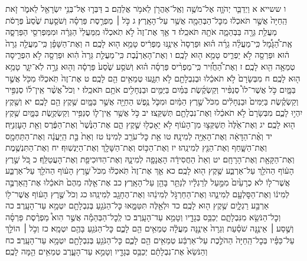 \documentclass[twoside, openany, parskip=half, 11pt]{book}
\begin{document}
ו ששייא א וַיְדַבֵּ֧ר יְהֹוָ֛ה אֶל־מֹשֶׁ֥ה וְאֶֽל־אַהֲרֹ֖ן לֵאמֹ֥ר אֲלֵהֶֽם׃ ב דַּבְּר֛וּ אֶל־בְּנֵ֥י יִשְׂרָאֵ֖ל לֵאמֹ֑ר זֹ֤את הַֽחַיָּה֙ אֲשֶׁ֣ר תֹּאכְל֔וּ מִכׇּל־הַבְּהֵמָ֖ה אֲשֶׁ֥ר עַל־הָאָֽרֶץ׃ ג כֹּ֣ל ׀ מַפְרֶ֣סֶת פַּרְסָ֗ה וְשֹׁסַ֤עַת שֶׁ֙סַע֙ פְּרָסֹ֔ת מַעֲלַ֥ת גֵּרָ֖ה בַּבְּהֵמָ֑ה אֹתָ֖הּ תֹּאכֵֽלוּ׃ ד אַ֤ךְ אֶת־זֶה֙ לֹ֣א תֹֽאכְל֔וּ מִֽמַּעֲלֵי֙ הַגֵּרָ֔ה וּמִמַּפְרִסֵ֖י הַפַּרְסָ֑ה אֶֽת־הַ֠גָּמָ֠ל כִּֽי־מַעֲלֵ֨ה גֵרָ֜ה ה֗וּא וּפַרְסָה֙ אֵינֶ֣נּוּ מַפְרִ֔יס טָמֵ֥א ה֖וּא לָכֶֽם׃ ה וְאֶת־הַשָּׁפָ֗ן כִּֽי־מַעֲלֵ֤ה גֵרָה֙ ה֔וּא וּפַרְסָ֖ה לֹ֣א יַפְרִ֑יס טָמֵ֥א ה֖וּא לָכֶֽם׃ ו וְאֶת־הָאַרְנֶ֗בֶת כִּֽי־מַעֲלַ֤ת גֵּרָה֙ הִ֔וא וּפַרְסָ֖ה לֹ֣א הִפְרִ֑יסָה טְמֵאָ֥ה הִ֖וא לָכֶֽם׃ ז וְאֶת־הַ֠חֲזִ֠יר כִּֽי־מַפְרִ֨יס פַּרְסָ֜ה ה֗וּא וְשֹׁסַ֥ע שֶׁ֙סַע֙ פַּרְסָ֔ה וְה֖וּא גֵּרָ֣ה לֹֽא־יִגָּ֑ר טָמֵ֥א ה֖וּא לָכֶֽם׃ ח מִבְּשָׂרָם֙ לֹ֣א תֹאכֵ֔לוּ וּבְנִבְלָתָ֖ם לֹ֣א תִגָּ֑עוּ טְמֵאִ֥ים הֵ֖ם לָכֶֽם׃ ט אֶת־זֶה֙ תֹּֽאכְל֔וּ מִכֹּ֖ל אֲשֶׁ֣ר בַּמָּ֑יִם כֹּ֣ל אֲשֶׁר־לוֹ֩ סְנַפִּ֨יר וְקַשְׂקֶ֜שֶׂת בַּמַּ֗יִם בַּיַּמִּ֛ים וּבַנְּחָלִ֖ים אֹתָ֥ם תֹּאכֵֽלוּ׃ י וְכֹל֩ אֲשֶׁ֨ר אֵֽין־ל֜וֹ סְנַפִּ֣יר וְקַשְׂקֶ֗שֶׂת בַּיַּמִּים֙ וּבַנְּחָלִ֔ים מִכֹּל֙ שֶׁ֣רֶץ הַמַּ֔יִם וּמִכֹּ֛ל נֶ֥פֶשׁ הַחַיָּ֖ה אֲשֶׁ֣ר בַּמָּ֑יִם שֶׁ֥קֶץ הֵ֖ם לָכֶֽם׃ יא וְשֶׁ֖קֶץ יִהְי֣וּ לָכֶ֑ם מִבְּשָׂרָם֙ לֹ֣א תֹאכֵ֔לוּ וְאֶת־נִבְלָתָ֖ם תְּשַׁקֵּֽצוּ׃ יב כֹּ֣ל אֲשֶׁ֥ר אֵֽין־ל֛וֹ סְנַפִּ֥יר וְקַשְׂקֶ֖שֶׂת בַּמָּ֑יִם שֶׁ֥קֶץ ה֖וּא לָכֶֽם׃ יג וְאֶת־אֵ֙לֶּה֙ תְּשַׁקְּצ֣וּ מִן־הָע֔וֹף לֹ֥א יֵאָכְל֖וּ שֶׁ֣קֶץ הֵ֑ם אֶת־הַנֶּ֙שֶׁר֙ וְאֶת־הַפֶּ֔רֶס וְאֵ֖ת הָעׇזְנִיָּֽה׃ יד וְאֶ֨ת־הַדָּאָ֔ה וְאֶת־הָאַיָּ֖ה לְמִינָֽהּ׃ טו אֵ֥ת כׇּל־עֹרֵ֖ב לְמִינֽוֹ׃ טז וְאֵת֙ בַּ֣ת הַֽיַּעֲנָ֔ה וְאֶת־הַתַּחְמָ֖ס וְאֶת־הַשָּׁ֑חַף וְאֶת־הַנֵּ֖ץ לְמִינֵֽהוּ׃ יז וְאֶת־הַכּ֥וֹס וְאֶת־הַשָּׁלָ֖ךְ וְאֶת־הַיַּנְשֽׁוּף׃ יח וְאֶת־הַתִּנְשֶׁ֥מֶת וְאֶת־הַקָּאָ֖ת וְאֶת־הָרָחָֽם׃ יט וְאֵת֙ הַחֲסִידָ֔ה הָאֲנָפָ֖ה לְמִינָ֑הּ וְאֶת־הַדּוּכִיפַ֖ת וְאֶת־הָעֲטַלֵּֽף׃ כ כֹּ֚ל שֶׁ֣רֶץ הָע֔וֹף הַהֹלֵ֖ךְ עַל־אַרְבַּ֑ע שֶׁ֥קֶץ ה֖וּא לָכֶֽם׃ כא אַ֤ךְ אֶת־זֶה֙ תֹּֽאכְל֔וּ מִכֹּל֙ שֶׁ֣רֶץ הָע֔וֹף הַהֹלֵ֖ךְ עַל־אַרְבַּ֑ע אֲשֶׁר־ל֤וֹ לא כְרָעַ֙יִם֙ מִמַּ֣עַל לְרַגְלָ֔יו לְנַתֵּ֥ר בָּהֵ֖ן עַל־הָאָֽרֶץ׃ כב אֶת־אֵ֤לֶּה מֵהֶם֙ תֹּאכֵ֔לוּ אֶת־הָֽאַרְבֶּ֣ה לְמִינ֔וֹ וְאֶת־הַסׇּלְעָ֖ם לְמִינֵ֑הוּ וְאֶת־הַחַרְגֹּ֣ל לְמִינֵ֔הוּ וְאֶת־הֶחָגָ֖ב לְמִינֵֽהוּ׃ כג וְכֹל֙ שֶׁ֣רֶץ הָע֔וֹף אֲשֶׁר־ל֖וֹ אַרְבַּ֣ע רַגְלָ֑יִם שֶׁ֥קֶץ ה֖וּא לָכֶֽם׃ כד וּלְאֵ֖לֶּה תִּטַּמָּ֑אוּ כׇּל־הַנֹּגֵ֥עַ בְּנִבְלָתָ֖ם יִטְמָ֥א עַד־הָעָֽרֶב׃ כה וְכׇל־הַנֹּשֵׂ֖א מִנִּבְלָתָ֑ם יְכַבֵּ֥ס בְּגָדָ֖יו וְטָמֵ֥א עַד־הָעָֽרֶב׃ כו לְֽכׇל־הַבְּהֵמָ֡ה אֲשֶׁ֣ר הִוא֩ מַפְרֶ֨סֶת פַּרְסָ֜ה וְשֶׁ֣סַע ׀ אֵינֶ֣נָּה שֹׁסַ֗עַת וְגֵרָה֙ אֵינֶ֣נָּה מַעֲלָ֔ה טְמֵאִ֥ים הֵ֖ם לָכֶ֑ם כׇּל־הַנֹּגֵ֥עַ בָּהֶ֖ם יִטְמָֽא׃ כז וְכֹ֣ל ׀ הוֹלֵ֣ךְ עַל־כַּפָּ֗יו בְּכׇל־הַֽחַיָּה֙ הַהֹלֶ֣כֶת עַל־אַרְבַּ֔ע טְמֵאִ֥ים הֵ֖ם לָכֶ֑ם כׇּל־הַנֹּגֵ֥עַ בְּנִבְלָתָ֖ם יִטְמָ֥א עַד־הָעָֽרֶב׃ כח וְהַנֹּשֵׂא֙ אֶת־נִבְלָתָ֔ם יְכַבֵּ֥ס בְּגָדָ֖יו וְטָמֵ֣א עַד־הָעָ֑רֶב טְמֵאִ֥ים הֵ֖מָּה לָכֶֽם׃
\end{document}

